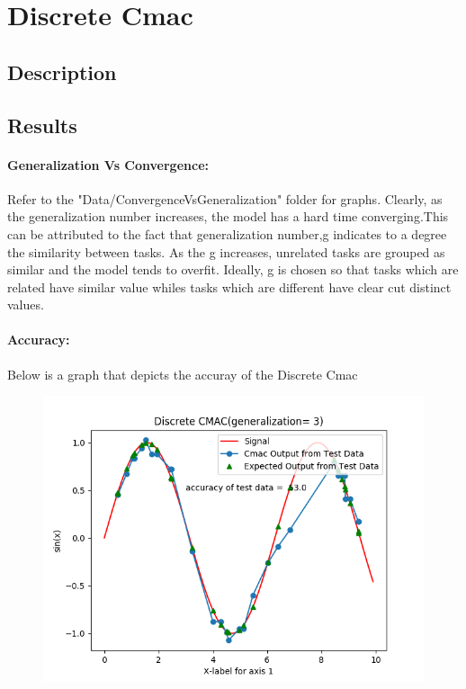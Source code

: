 \documentclass{article}
\begin{document}
\section{Discrete Cmac}
\subsection{Description}
\subsection{Results}
  \paragraph{Generalization Vs Convergence:}
  Refer to the "Data/ConvergenceVsGeneralization" folder for graphs. Clearly,
  as the generalization number increases, the model has a hard time converging.This can
  be attributed to the fact that generalization number,g indicates to a degree the similarity
  between tasks. As the g increases, unrelated tasks are grouped as similar and the model tends
  to overfit. Ideally, g is chosen so that tasks which are related have similar value whiles tasks
  which are different have clear cut distinct values. 
  \paragraph{Accuracy:}
    Below is a graph that depicts the accuray of the Discrete Cmac
  \begin{figure}[h!]
    \includegraphics[scale=0.65]{./Data/Accuracy/discreteAccuracy.png}
  \end{figure}
\end{document}
